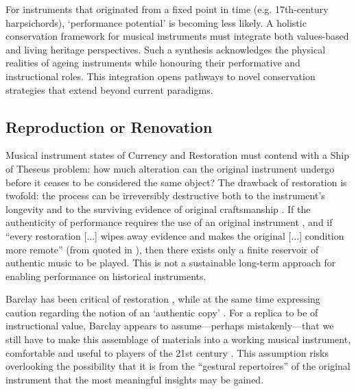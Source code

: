 For instruments that originated from a fixed point in time (e.g. 17th-century
harpsichords), `performance potential' is becoming less likely. A holistic
conservation framework for musical instruments must integrate both values-based
and living heritage perspectives. Such a synthesis acknowledges the physical
realities of ageing instruments while honouring their performative and
instructional roles. This integration opens pathways to novel conservation
strategies that extend beyond current paradigms.


%

\subsection{Reproduction or Renovation}\label{sec:reproduction-or-renovation}

Musical instrument states of Currency and Restoration must contend with a Ship
of Theseus problem: how much alteration can the original instrument undergo
before it ceases to be considered the same object? The drawback of restoration
is twofold: the process can be irreversibly destructive both to the instrument’s
longevity \cite{barclay_care_1997} and to the surviving evidence of original
craftsmanship \cite{karp_restoration_1979}. If the authenticity of performance
requires the use of an original instrument \cite{karp_musical_1985}, and if
``every restoration [...] wipes away evidence and makes the original [...]
condition more remote'' (from \cite{waitzman_music_1988} quoted in
\cite{barclay_critical_1999}), then there exists only a finite reservoir of
authentic music to be played. This is not a sustainable long-term approach for
enabling performance on historical instruments.

Barclay has been critical of restoration \cite{barclay_care_1997}, while at the
same time expressing caution regarding the notion of an `authentic copy'
\cite{barclay_preservation_2005}. For a replica to be of instructional value,
Barclay appears to assume---perhaps mistakenly---that we still have to make this
assemblage of materials into a working musical instrument, comfortable and
useful to players of the 21st century \cite{barclay_preservation_2005}. This
assumption risks overlooking the possibility that it is from the ``gestural
repertoires'' \cite{levinson_music_1990} of the original instrument that the
most meaningful insights may be gained.

